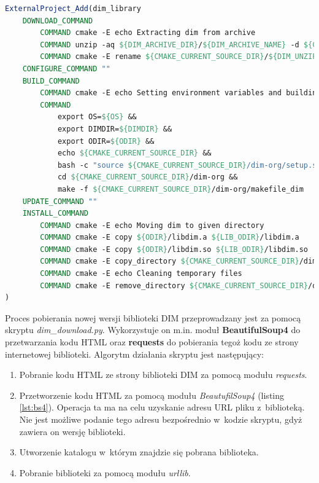 \begin{lstlisting}[language=cmake, caption={Fragment pliku \textit{CMakeLists.txt} przeznaczonego do konfiguracji procesu budowania biblioteki DIM. Widoczne zastosowanie funkcjonalności \textit{ExternalProject} pozwalającej na wykorzystanie plików \textit{Makefile} (makefile\_dim) dostarczonych przez autorów biblioteki.}, label={lst:dimexternal}]
ExternalProject_Add(dim_library
    DOWNLOAD_COMMAND 
        COMMAND cmake -E echo Extracting dim from archive
        COMMAND unzip -aq ${DIM_ARCHIVE_DIR}/${DIM_ARCHIVE_NAME} -d ${CMAKE_CURRENT_SOURCE_DIR}
        COMMAND cmake -E rename ${CMAKE_CURRENT_SOURCE_DIR}/${DIM_UNZIP_OUTPUT_DIRECTORY} ${CMAKE_CURRENT_SOURCE_DIR}/dim-org
    CONFIGURE_COMMAND ""
    BUILD_COMMAND 
        COMMAND cmake -E echo Setting environment variables and building
        COMMAND 
            export OS=${OS} && 
            export DIMDIR=${DIMDIR} && 
            export ODIR=${ODIR} && 
            echo ${CMAKE_CURRENT_SOURCE_DIR} && 
            bash -c "source ${CMAKE_CURRENT_SOURCE_DIR}/dim-org/setup.sh" && 
            cd ${CMAKE_CURRENT_SOURCE_DIR}/dim-org && 
            make -f ${CMAKE_CURRENT_SOURCE_DIR}/dim-org/makefile_dim
    UPDATE_COMMAND ""
    INSTALL_COMMAND 
        COMMAND cmake -E echo Moving dim to given directory
        COMMAND cmake -E copy ${ODIR}/libdim.a ${LIB_ODIR}/libdim.a
        COMMAND cmake -E copy ${ODIR}/libdim.so ${LIB_ODIR}/libdim.so
        COMMAND cmake -E copy_directory ${CMAKE_CURRENT_SOURCE_DIR}/dim-org/dim ${INCLUDE_ODIR}/dim
        COMMAND cmake -E echo Cleaning temporary files
        COMMAND cmake -E remove_directory ${CMAKE_CURRENT_SOURCE_DIR}/dim-org
)
\end{lstlisting}

Proces pobierania nowej wersji biblioteki DIM przeprowadzany jest za pomocą skryptu \textit{dim\_download.py}. Wykorzystuje on m.in. moduł \textbf{BeautifulSoup4} do przetwarzania kodu HTML oraz \textbf{requests} do pobierania tegoż kodu ze strony internetowej biblioteki. Algorytm działania skryptu jest następujący:
\begin{enumerate}
\item Pobranie kodu HTML ze strony biblioteki DIM za pomocą modułu \textit{requests}.
\item Przetworzenie kodu HTML za pomocą modułu \textit{BeautufilSoup4} (listing \ref{lst:bs4}). Operacja ta ma na celu uzyskanie adresu URL pliku z~biblioteką. Nie jest możliwe podanie tego adresu bezpośrednio w~kodzie skryptu, gdyż zawiera on wersję biblioteki. 
\item Utworzenie katalogu w~którym znajdzie się pobrana biblioteka.
\item Pobranie biblioteki za pomocą modułu \textit{urllib}.
\end{enumerate}


